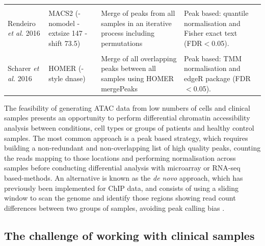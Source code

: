\begin{landscape}
\begin{center}
\begin{longtable}[ht]{p{.20\textheight} p{.40\textheight} p{.40\textheight} p{.40\textheight}}
 &&&\\  						
Rendeiro \textit{et al.} 2016 & MACS2 (-nomodel -extsize 147 -shift 73.5)	& Merge of peaks from all samples in an iterative process including permutations & Peak based: quantile normalisation and Fisher exact text (FDR$<$0.05). \\
 &&&\\  
Scharer \textit{et al.} 2016 & HOMER (-style dnase) & Merge of all overlapping peaks between all samples using HOMER mergePeaks & Peak based: TMM normalisation and edgeR package (FDR$<$0.05). \\														   
\bottomrule
\end{longtable}
\end{center}
\end{landscape}


The feasibility of generating ATAC data from low numbers of cells and clinical samples presents an opportunity to perform differential chromatin accessibility analysis between conditions, cell types or groups of patients and healthy control samples. The most common approach is a peak based strategy, which requires building a non-redundant and non-overlapping list of high quality peaks, counting the reads mapping to those locations and performing normalisation across samples before conducting differential analysis with microarray or RNA-seq based-methods. An alternative is known as the \textit{de novo} approach, which has previously been implemented for ChIP data, and consists of using a sliding window to scan the genome and identify those regions showing read count differences between two groups of samples, avoiding peak calling bias \parencite{Shen2013}.     


\subsection{The challenge of working with clinical samples}

